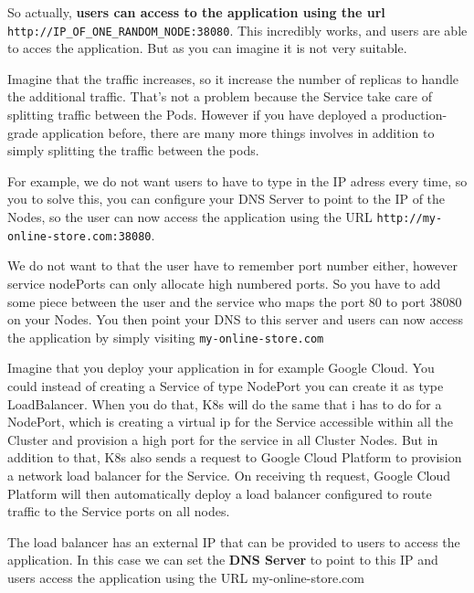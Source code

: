 \documentclass{article}
\begin{document}
 So actually, \textbf{users can access to the application using the url} \verb|http://IP_OF_ONE_RANDOM_NODE:38080|. This incredibly works, and users are able to acces the application. But as you can imagine it is not very suitable.

 Imagine that the traffic increases, so it increase the number of replicas to handle the additional traffic. That's not a problem because the Service take care of splitting traffic between the Pods. However if you have deployed a production-grade application before, there are many more things involves in addition to simply splitting the traffic between the pods. 
 
 For example, we do not want users to have to type in the IP adress every time, so you to solve this, you can configure your DNS Server to point to the IP of the Nodes, so the user can now access the application using the URL \verb+http://my-online-store.com:38080+.

 We do not want to that the user have to remember port number either, however service nodePorts can  only allocate high numbered ports. So you have to add some piece between the user and the service who maps the port 80 to port 38080 on your Nodes. You then point your DNS to this server and users can now access the application by simply visiting \verb|my-online-store.com|

Imagine that you deploy your application in for example Google Cloud. You could instead of creating a Service of type NodePort you can create it as type LoadBalancer. When you do that, K8s will do the same that i has to do for a NodePort, which is creating a virtual ip for the Service accessible within all the Cluster and provision a high port for the service in all Cluster Nodes. But in addition to that, K8s also sends a request to Google Cloud Platform to provision a network load balancer for the Service. On receiving th request, Google Cloud Platform will then automatically deploy a load balancer configured to route traffic to the Service ports on all nodes.

The load balancer has an external IP that can be provided to users to access the application. In this case we can set the \textbf{DNS Server} to point to this IP and users access the application using the URL my-online-store.com
\end{document}
